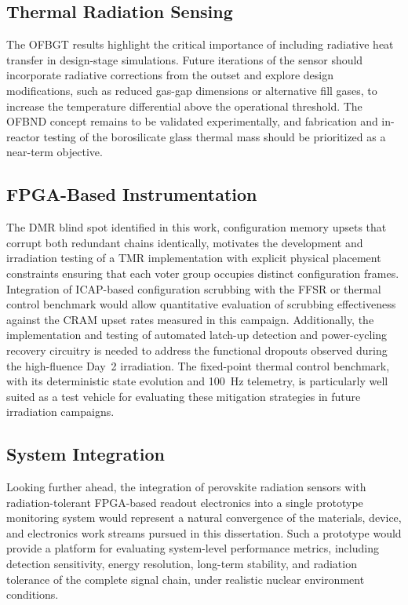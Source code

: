 \subsection{Thermal Radiation Sensing}

The OFBGT results highlight the critical importance of including
radiative heat transfer in design-stage simulations.  Future
iterations of the sensor should incorporate radiative corrections
from the outset and explore design modifications, such as reduced
gas-gap dimensions or alternative fill gases, to increase the
temperature differential above the operational threshold.  The OFBND
concept remains to be validated experimentally, and fabrication and
in-reactor testing of the borosilicate glass thermal mass should be
prioritized as a near-term objective.

\subsection{FPGA-Based Instrumentation}

The DMR blind spot identified in this work, configuration memory
upsets that corrupt both redundant chains identically, motivates the
development and irradiation testing of a TMR implementation with
explicit physical placement constraints ensuring that each voter group
occupies distinct configuration frames.  Integration of ICAP-based
configuration scrubbing with the FFSR or thermal control benchmark
would allow quantitative evaluation of scrubbing effectiveness against
the CRAM upset rates measured in this campaign.  Additionally, the
implementation and testing of automated latch-up detection and
power-cycling recovery circuitry is needed to address the functional
dropouts observed during the high-fluence Day~2 irradiation.  The
fixed-point thermal control benchmark, with its deterministic state
evolution and 100~Hz telemetry, is particularly well suited as a test
vehicle for evaluating these mitigation strategies in future
irradiation campaigns.

\subsection{System Integration}

Looking further ahead, the integration of perovskite radiation sensors
with radiation-tolerant FPGA-based readout electronics into a single
prototype monitoring system would represent a natural convergence of
the materials, device, and electronics work streams pursued in this
dissertation.  Such a prototype would provide a platform for
evaluating system-level performance metrics, including detection
sensitivity, energy resolution, long-term stability, and radiation
tolerance of the complete signal chain, under realistic nuclear
environment conditions.